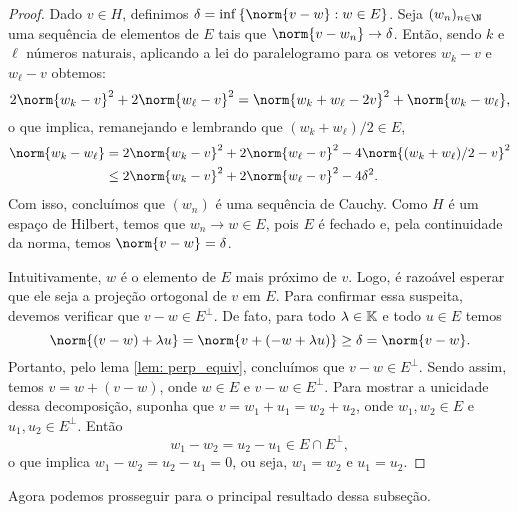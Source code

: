 \begin{proof}
    Dado \( v \in H \), definimos \( \delta = \inf \left\{ \norm{ v - w } : w \in E \right\} \).
    Seja \( (w_{ n })_{ n\in\N } \) uma sequência de elementos de \( E \) tais que \( \norm{ v - w_{ n } } \to \delta \).
    Então, sendo \( k \) e \( \ell \) números naturais, aplicando a lei do paralelogramo para os vetores \( w_{ k } - v \) e \( w_{ \ell } - v \) obtemos: \[
        2 \norm{ w_{ k } - v }^2 + 2 \norm{ w_{ \ell } - v }^2
        = \norm{ w_{ k } + w_{ \ell } - 2v }^2 + \norm{ w_{ k } - w_{ \ell } }
    ,\]
    o que implica, remanejando e lembrando que \( (w_{ k } + w_{ \ell })/2 \in E \),
    \begin{align*}
        \norm{ w_{ k } - w_{ \ell } }
        &= 2 \norm{ w_{ k } - v }^2 + 2 \norm{ w_{ \ell } - v }^2 - 4 \norm{ (w_{ k } + w_{ \ell })/2 - v }^2 \\
        &\leq 2 \norm{ w_{ k } - v }^2 + 2 \norm{ w_{ \ell } - v }^2 - 4 \delta^2
    .\end{align*}
    Com isso, concluímos que \( (w_{ n }) \) é uma sequência de Cauchy.
    Como \( H \) é um espaço de Hilbert, temos que \( w_{ n } \to w \in E \), pois \( E \) é fechado e, pela continuidade da norma, temos \( \norm{ v - w } = \delta \).

    Intuitivamente, \( w \) é o elemento de \( E \) mais próximo de \( v \).
    Logo, é razoável esperar que ele seja a projeção ortogonal de \( v \) em \( E \).
    Para confirmar essa suspeita, devemos verificar que \( v - w \in E^{ \perp } \).
    De fato, para todo \( \lambda \in \mathbb{K} \) e todo \( u \in E \) temos \[
        \norm{ (v - w) + \lambda u }
        = \norm{ v + (-w + \lambda u) }
        \geq \delta
        = \norm{ v - w }
    .\]
    Portanto, pelo lema \ref{lem: perp_equiv}, concluímos que \( v - w \in E^{ \perp } \).
    Sendo assim, temos \( v = w + (v - w) \), onde \( w \in E \) e \( v - w \in E^{ \perp } \).
    Para mostrar a unicidade dessa decomposição, suponha que \( v = w_{ 1 } + u_{ 1 } = w_{ 2 } + u_{ 2 } \), onde \( w_{ 1 }, w_{ 2 } \in E \) e \( u_{ 1 }, u_{ 2 } \in E^{ \perp } \).
    Então \[
        w_{ 1 } - w_{ 2 } = u_{ 2 } - u_{ 1 } \in E \cap E^{ \perp }
    ,\]
    o que implica \( w_{ 1 } - w_{ 2 } = u_{ 2 } - u_{ 1 } = 0 \), ou seja, \( w_{ 1 } = w_{ 2 } \) e \( u_{ 1 } = u_{ 2 } \).
\end{proof}

Agora podemos prosseguir para o principal resultado dessa subseção.

